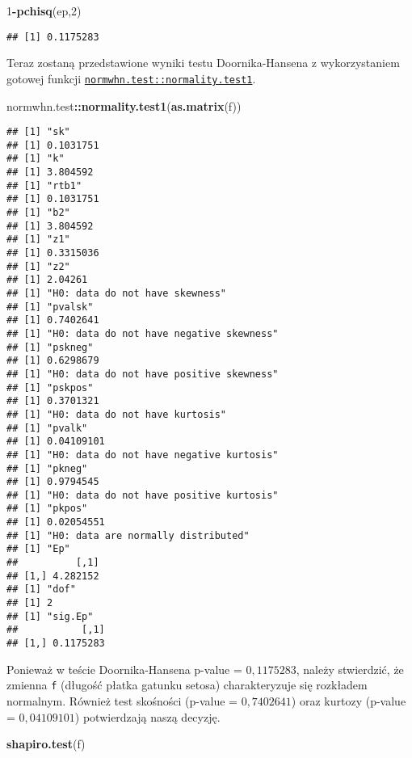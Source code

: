 \documentclass[polish,]{book}
\newenvironment{Shaded}{\begin{snugshade}}{\end{snugshade}}
\newcommand{\DecValTok}[1]{\textcolor[rgb]{0.00,0.00,0.81}{#1}}
\newcommand{\KeywordTok}[1]{\textcolor[rgb]{0.13,0.29,0.53}{\textbf{#1}}}
\newcommand{\NormalTok}[1]{#1}
\newcommand{\OperatorTok}[1]{\textcolor[rgb]{0.81,0.36,0.00}{\textbf{#1}}}
\begin{document}
\begin{Shaded}
\begin{Highlighting}[]
\DecValTok{1}\OperatorTok{-}\KeywordTok{pchisq}\NormalTok{(ep,}\DecValTok{2}\NormalTok{)}
\end{Highlighting}
\end{Shaded}

\begin{verbatim}
## [1] 0.1175283
\end{verbatim}

Teraz zostaną przedstawione wyniki testu Doornika-Hansena z wykorzystaniem gotowej funkcji \href{https://rdrr.io/cran/normwhn.test/man/normality.test1.html}{\texttt{normwhn.test::normality.test1}}.

\begin{Shaded}
\begin{Highlighting}[]
\NormalTok{normwhn.test}\OperatorTok{::}\KeywordTok{normality.test1}\NormalTok{(}\KeywordTok{as.matrix}\NormalTok{(f))}
\end{Highlighting}
\end{Shaded}

\begin{verbatim}
## [1] "sk"
## [1] 0.1031751
## [1] "k"
## [1] 3.804592
## [1] "rtb1"
## [1] 0.1031751
## [1] "b2"
## [1] 3.804592
## [1] "z1"
## [1] 0.3315036
## [1] "z2"
## [1] 2.04261
## [1] "H0: data do not have skewness"
## [1] "pvalsk"
## [1] 0.7402641
## [1] "H0: data do not have negative skewness"
## [1] "pskneg"
## [1] 0.6298679
## [1] "H0: data do not have positive skewness"
## [1] "pskpos"
## [1] 0.3701321
## [1] "H0: data do not have kurtosis"
## [1] "pvalk"
## [1] 0.04109101
## [1] "H0: data do not have negative kurtosis"
## [1] "pkneg"
## [1] 0.9794545
## [1] "H0: data do not have positive kurtosis"
## [1] "pkpos"
## [1] 0.02054551
## [1] "H0: data are normally distributed"
## [1] "Ep"
##          [,1]
## [1,] 4.282152
## [1] "dof"
## [1] 2
## [1] "sig.Ep"
##           [,1]
## [1,] 0.1175283
\end{verbatim}

Ponieważ w teście Doornika-Hansena p-value = \(0,1175283\), należy stwierdzić, że
zmienna \texttt{f} (długość płatka gatunku setosa) charakteryzuje się rozkładem normalnym. Również test skośności (p-value = \(0,7402641\)) oraz kurtozy (p-value =
\(0,04109101\)) potwierdzają naszą decyzję.

\begin{Shaded}
\begin{Highlighting}[]
\KeywordTok{shapiro.test}\NormalTok{(f)}
\end{Highlighting}
\end{Shaded}
\end{document}
